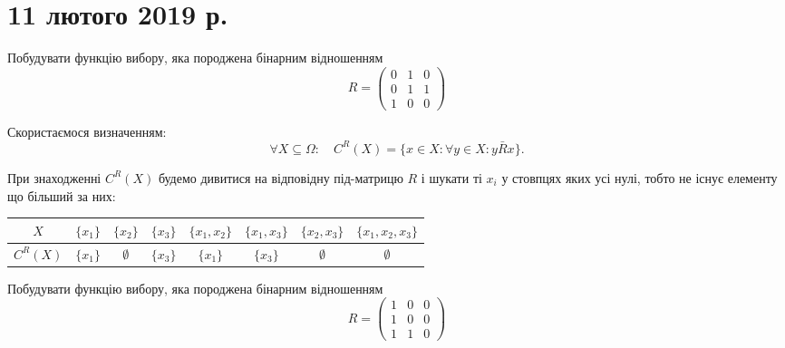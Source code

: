 \section*{11 лютого 2019 р.}

\setcounter{problem}{0}

\begin{problem*}[класна]
    Побудувати функцію вибору, яка породжена бінарним відношенням \[ R = \begin{pmatrix} 0 & 1 & 0 \\ 0 & 1 & 1 \\ 1 & 0 & 0 \end{pmatrix} \]
\end{problem*}

\begin{solution}
    Скористаємося визначенням: \[ \forall X \subseteq \Omega: \quad C^R(X) = \{ x \in X: \forall y \in X: y \bar R x \}.\]
    
    При знаходженні $C^R(X)$ будемо дивитися на відповідну під-матрицю $R$ і шукати ті $x_i$ у стовпцях яких усі нулі, тобто не існує елементу що більший за них:
    
    \begin{table}[H]
        \centering
        \begin{tabular}{|c|c|c|c|c|c|c|c|}
            \hline
            $X$ & $\{x_1\}$ & $\{x_2\}$ & $\{x_3\}$ & $\{x_1, x_2\}$ & $\{x_1, x_3\}$ & $\{x_2, x_3\}$ & $\{x_1, x_2, x_3\}$ \\ \hline
                $C^R(X)$ & $\{x_1\}$ & $\emptyset$ & $\{x_3\}$ & $\{x_1\}$ & $\{x_3\}$ & $\emptyset$ & $\emptyset$ \\ \hline
        \end{tabular}
    \end{table}
\end{solution}

\begin{problem}
    Побудувати функцію вибору, яка породжена бінарним відношенням \[ R = \begin{pmatrix} 1 & 0 & 0 \\ 1 & 0 & 0 \\ 1 & 1 & 0 \end{pmatrix} \]
\end{problem}

